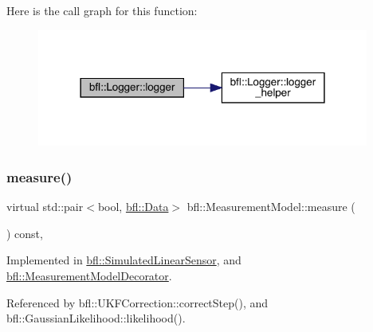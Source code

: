 Here is the call graph for this function\+:
\nopagebreak
\begin{figure}[H]
\begin{center}
\leavevmode
\includegraphics[width=309pt]{classbfl_1_1Logger_a0f0cf7ce956546d94dfb1feb7cebf171_cgraph}
\end{center}
\end{figure}
\mbox{\label{classbfl_1_1MeasurementModel_ad372b720cef4e6bc0ac2489f4098bfc9}} 
\subsubsection{\texorpdfstring{measure()}{measure()}}
{\footnotesize\ttfamily virtual std\+::pair$<$bool, \mbox{\hyperlink{namespacebfl_af6b103c6821db1b54452f776fdd9dd02}{bfl\+::\+Data}}$>$ bfl\+::\+Measurement\+Model\+::measure (\begin{DoxyParamCaption}{ }\end{DoxyParamCaption}) const\hspace{0.3cm}{\ttfamily [pure virtual]}, {\ttfamily [inherited]}}



Implemented in \mbox{\hyperlink{classbfl_1_1SimulatedLinearSensor_a61c278bdbc5f3a0201d2f855a739d4f4}{bfl\+::\+Simulated\+Linear\+Sensor}}, and \mbox{\hyperlink{classbfl_1_1MeasurementModelDecorator_a36194c2f6abd7e13a417c3663febe921}{bfl\+::\+Measurement\+Model\+Decorator}}.



Referenced by bfl\+::\+U\+K\+F\+Correction\+::correct\+Step(), and bfl\+::\+Gaussian\+Likelihood\+::likelihood().

\mbox{\label{classbfl_1_1LinearModel_a71ceb19612369c796840cbb592e99365}} 
